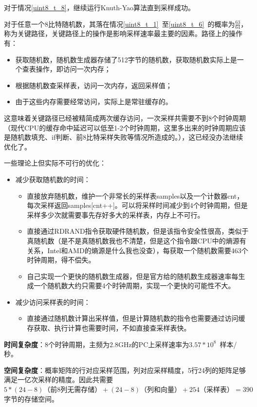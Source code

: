 \documentclass{article}
\begin{document}
	对于情况\ref{uint8_t_8}，继续运行Knuth-Yao算法直到采样成功。
	
	对于任意一个8比特随机数，其落在情况\ref{uint8_t_1}~至\ref{uint8_t_6}~的概率为$\frac{63}{64}$，称为关键路径，关键路径上的操作是影响采样速率最主要的因素。路径上的操作有：
	\begin{itemize}
		\item 获取随机数，随机数生成器存储了512字节的随机数，获取随机数实际上是一个查表操作，即访问一次内存；
		\item 根据随机数查采样表，访问一次内存，返回采样值；
		\item 由于这些内存需要经常访问，实际上是常驻缓存的。
	\end{itemize}
	这意味着关键路径已经被精简成两次缓存访问，一次采样共需要不到8个时钟周期（现代CPU的缓存命中延迟可以低至1-2个时钟周期，这里多出来的时钟周期应该是随机数填充、if判断、前8比特采样失败等情况所造成的。），这已经没办法继续优化了。
	
	一些理论上但实际不可行的优化：
	\begin{itemize}
		\item 减少获取随机数的时间：
		\begin{itemize}
			\item 直接放弃随机数，维护一个非常长的采样表samples以及一个计数器cnt，每次采样返回samples[cnt++]。可以将采样时间减少到4个时钟周期，但是采样多少次就需要事先存好多大的采样表，内存上不可行。
			\item 直接通过RDRAND指令获取硬件随机数，但是该指令安全性很高，类似于真随机数（是不是真随机数我也不清楚，但是这个指令跟CPU中的熵源有关系，Intel和AMD的熵源是什么我也没查），每获取一个随机数需要463个时钟周期，得不偿失。
			\item 自己实现一个更快的随机数生成器，但是官方给的随机数生成器速率每生成一个随机数大约只需要4个时钟周期，实现一个更快的可能性不大。
		\end{itemize}
		\item 减少访问采样表的时间：
		\begin{itemize}
			\item 直接通过随机数计算出采样值，但是计算随机数的指令也需要通过访问缓存获取、执行计算也需要时间，不如直接查采样表快。
		\end{itemize}
	\end{itemize}
	
	\textbf{时间复杂度}：8个时钟周期，主频为2.8GHz的PC上采样速率为$3.57*10^8$~样本/秒。
	
	\textbf{空间复杂度}：概率矩阵的行对应采样范围，列对应采样精度，5行24列的矩阵足够满足一亿次采样的精度。因此共需要$5 * (24-8)\mbox{（前8列无需存储）} + (24-8)\mbox{（列和向量）} + 254\mbox{（采样表）} = 390$字节的存储空间。
	
\end{document}
